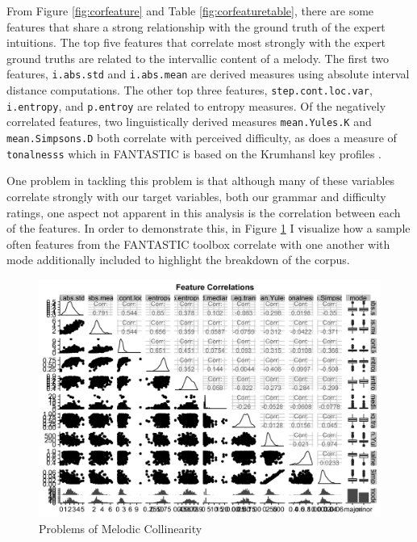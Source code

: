 \documentclass[]{book}
\begin{document}
From Figure \ref{fig:corfeature} and Table \ref{fig:corfeaturetable}, there are some features that share a strong relationship with the ground truth of the expert intuitions.
The top five features that correlate most strongly with the expert ground truths are related to the intervallic content of a melody.
The first two features, \texttt{i.abs.std} and \texttt{i.abs.mean} are derived measures using absolute interval distance computations.
The other top three features, \texttt{step.cont.loc.var}, \texttt{i.entropy}, and \texttt{p.entroy} are related to entropy measures.
Of the negatively correlated features, two linguistically derived measures \texttt{mean.Yules.K} and \texttt{mean.Simpsons.D} both correlate with perceived difficulty, as does a measure of \texttt{tonalnesss} which in FANTASTIC is based on the Krumhansl key profiles \citep{krumhanslCognitiveFoundationsMusical2001}.

One problem in tackling this problem is that although many of these variables correlate strongly with our target variables, both our grammar and difficulty ratings, one aspect not apparent in this analysis is the correlation between each of the features.
In order to demonstrate this, in Figure \ref{fig:featurecorrelations} I visualize how a sample often features from the FANTASTIC toolbox correlate with one another with mode additionally included to highlight the breakdown of the corpus.

\begin{figure}

{\centering \includegraphics[width=1\linewidth]{img/FANTASTIC_collin} 

}

\caption{Problems of Melodic Collinearity}\label{fig:featurecorrelations}
\end{figure}
\end{document}

